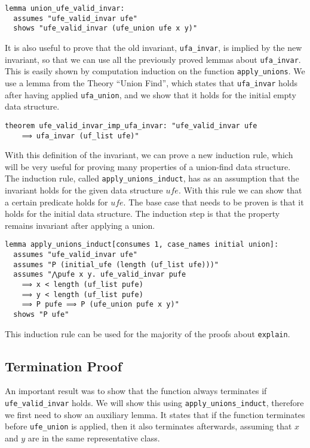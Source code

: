 \begin{lstlisting}
lemma union_ufe_valid_invar:
  assumes "ufe_valid_invar ufe"
  shows "ufe_valid_invar (ufe_union ufe x y)"
\end{lstlisting}

It is also useful to prove that the old invariant, \lstinline{ufa_invar}, is implied by the new invariant, so that we can use all the previously proved lemmas about \lstinline{ufa_invar}. This is easily shown by computation induction on the function \lstinline{apply_unions}. We use a lemma from the Theory ``Union Find'', which states that \lstinline{ufa_invar} holds after having applied \lstinline{ufa_union}, and we show that it holds for the initial empty data structure.

\begin{lstlisting}
theorem ufe_valid_invar_imp_ufa_invar: "ufe_valid_invar ufe
    ⟹ ufa_invar (uf_list ufe)"
\end{lstlisting}

With this definition of the invariant, we can prove a new induction rule, which will be very useful for proving many properties of a union-find data structure. The induction rule, called \lstinline{apply_unions_induct}, has as an assumption that the invariant holds for the given data structure $ufe$. With this rule we can show that a certain predicate holds for $ufe$. The base case that needs to be proven is that it holds for the initial data structure. The induction step is that the property remains invariant after applying a union.

\begin{lstlisting}
lemma apply_unions_induct[consumes 1, case_names initial union]:
  assumes "ufe_valid_invar ufe"
  assumes "P (initial_ufe (length (uf_list ufe)))"
  assumes "⋀pufe x y. ufe_valid_invar pufe
    ⟹ x < length (uf_list pufe)
    ⟹ y < length (uf_list pufe)
    ⟹ P pufe ⟹ P (ufe_union pufe x y)"
  shows "P ufe"
\end{lstlisting}

This induction rule can be used for the majority of the proofs about \lstinline|explain|.

\subsection{Termination Proof}
\label{subsection:termination}

An important result was to show that the function always terminates if \lstinline{ufe_valid_invar} holds. We will show this using \lstinline|apply_unions_induct|, therefore we first need to show an auxiliary lemma. It states that if the function terminates before \lstinline{ufe_union} is applied, then it also terminates afterwards, assuming that $x$ and $y$ are in the same representative class.

